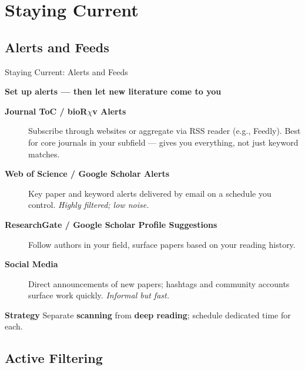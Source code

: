 \documentclass{beamer}
\begin{document}
\section{Staying Current}
\subsection{Alerts and Feeds}

\begin{frame}{Staying Current: Alerts and Feeds}

  \footnotesize
  \textbf{Set up alerts --- then let new literature come to you}

  \smallskip
  \begin{description}

    \item[\textbf{Journal ToC / bioR$\chi$v Alerts}]
      Subscribe through websites or aggregate
      via RSS reader (e.g., Feedly). Best for core journals in
      your subfield --- gives you everything, not just keyword matches.

    \item[\textbf{Web of Science / Google Scholar Alerts}]
      Key paper and keyword alerts delivered by email on a schedule
      you control. \textit{Highly filtered; low noise.}

    \item[\textbf{ResearchGate / Google Scholar Profile Suggestions}]
      Follow authors in your field, surface papers
      based on your reading history.

    \item[\textbf{Social Media}]
      Direct announcements of new papers; hashtags
      and community accounts surface work quickly.
      \textit{Informal but fast.}
  \end{description}

  \medskip
  \begin{block}{\textbf{Strategy}}
    Separate \textbf{scanning} from \textbf{deep reading}; schedule dedicated time for each.
  \end{block}

\end{frame}


\subsection{Active Filtering}
\end{document}
